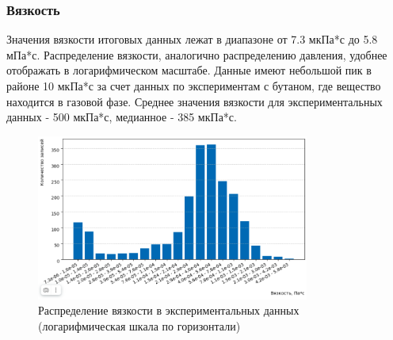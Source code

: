 \documentclass[a4paper,12pt]{article}
\begin{document}
    \subsubsection{Вязкость}
      Значения вязкости итоговых данных лежат в диапазоне от 7.3 мкПа*с до 5.8 мПа*с. Распределение вязкости, аналогично распределению давления, удобнее отображать в логарифмическом масштабе. Данные имеют небольшой пик в районе 10 мкПа*с за счет данных по экспериментам с бутаном, где вещество находится в газовой фазе. Среднее значения вязкости для экспериментальных данных - 500 мкПа*с, медианное - 385 мкПа*с. 
      \begin{figure}[ht]
        \centering
        \includegraphics[width=0.8\textwidth]{data_distribution_viscosity.png}
        \caption{Распределение вязкости в экспериментальных данных (логарифмическая шкала по горизонтали)}
        \label{fig:data_distribution_viscosity}
      \end{figure}
\end{document}
